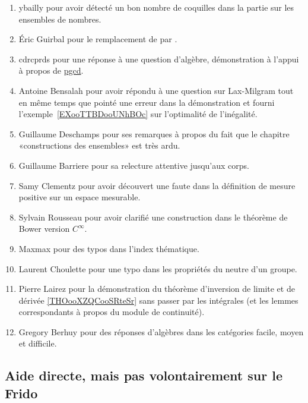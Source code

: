 \begin{enumerate}
    \item
        ybailly pour avoir détecté un bon nombre de coquilles dans la partie sur les ensembles de nombres.
    \item
        Éric Guirbal pour le remplacement de  par .
    \item
        cdrcprds pour une réponse à une question d'algèbre, démonstration à l'appui à propos de \href{https://github.com/LaurentClaessens/mazhe/issues/52#issuecomment-333251728}{pgcd}.
    \item
        Antoine Bensalah pour avoir répondu à une question sur Lax-Milgram tout en même temps que pointé une erreur dans la démonstration et fourni l'exemple~\ref{EXooTTBDooUNhBOc} sur l'optimalité de l'inégalité.
    \item
        Guillaume Deschamps pour ses remarques à propos du fait que le chapitre «constructions des ensembles» est très ardu.
    \item
        Guillaume Barriere pour sa relecture attentive jusqu'aux corps.
    \item
        Samy Clementz pour avoir découvert une faute dans la définition de mesure positive sur un espace mesurable.
    \item
        Sylvain Rousseau pour avoir clarifié une construction dans le théorème de Bower version \(  C^{\infty}\).
    \item
        Maxmax pour des typos dans l'index thématique.
    \item
        Laurent Choulette pour une typo dans les propriétés du neutre d'un groupe.
    \item
        Pierre Lairez pour la démonstration du théorème d'inversion de limite et de dérivée \ref{THOooXZQCooSRteSr} sans passer par les intégrales (et les lemmes correspondants à propos du module de continuité).
    \item
        Gregory Berhuy pour des réponses d'algèbres dans les catégories facile, moyen et difficile.
\end{enumerate}

\subsection{Aide directe, mais pas volontairement sur le Frido}

